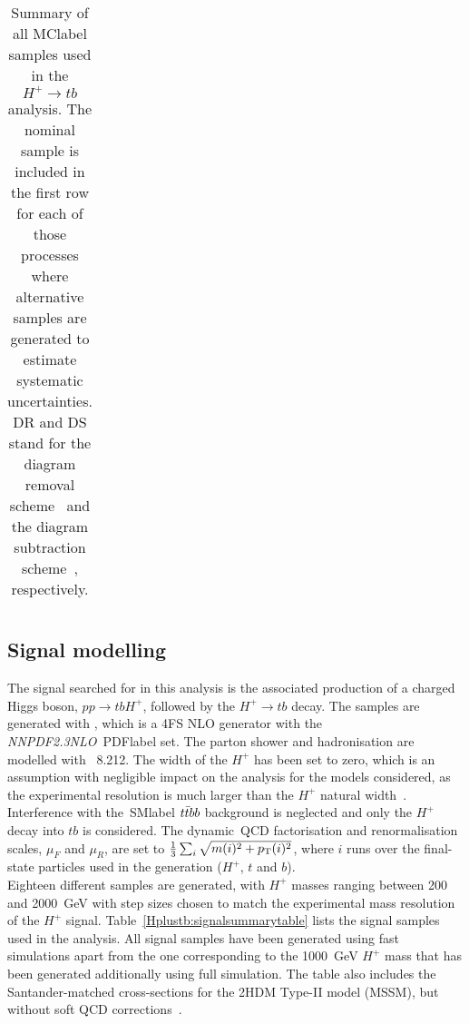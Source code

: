 \begin{table}[htbp]
\begin{tabular}{llllll}
    \bottomrule\bottomrule                               
    \end{tabular}
    \caption{Summary of all \acrshort{MClabel} samples used in the $H^+\to tb$ analysis. The nominal sample is included in the first row for each of those processes where alternative samples are generated to estimate systematic uncertainties. DR and DS stand for the diagram removal scheme~\cite{ATL-PHYS-PUB-2016-020} and the diagram
    subtraction scheme~\cite{Frederix_2012,Frixione_2008}, respectively.}
    \label{Hplustb:MCsummarytable}
\end{table}


\subsection{Signal modelling}

The signal searched for in this analysis is the associated production of a charged Higgs boson, $pp\to tb H^+$, followed by the $H^+\to tb$ decay. The samples are generated with \MGMCatNLO, which is a 4FS NLO generator with the \textit{NNPDF2.3NLO}~\acrshort{PDFlabel} set. The parton shower and hadronisation are modelled with \PYTHIA~8.212. The width of the $H^+$ has been set to zero, which is an assumption with negligible impact
on the analysis for the models considered, as the experimental resolution is much larger than the $H^+$ natural width~\cite{ChargedHiggshunting}. Interference with the~\acrshort{SMlabel} $t\bar{t} bb$ background is neglected and only the $H^+$ decay into $tb$ is considered. The dynamic~\acrshort{QCD} factorisation and renormalisation scales, $\mu_F$ and $\mu_R$, are set to $\frac{1}{3}\sum_i\sqrt{m(i)^2+p_{\text{T}}(i)^2}$, where $i$ runs over the final-state particles used in the generation ($H^+$, $t$ and $b$).\\

Eighteen different samples are generated, with $H^+$ masses ranging between 200 and 2000~GeV with step sizes chosen to match the experimental mass resolution of the $H^+$ signal. Table~\ref{Hplustb:signalsummarytable} lists the signal samples used in the analysis. All signal samples have been generated using fast simulations apart from the one corresponding to the 1000~GeV $H^+$ mass that has been generated additionally using full simulation. The table also includes the Santander-matched cross-sections for the 2HDM Type-II model (MSSM), but without soft QCD corrections~\cite{Degrande2015,PhysRevD.91.075015,PhysRevD.83.055005,PhysRevD.71.115012}.


